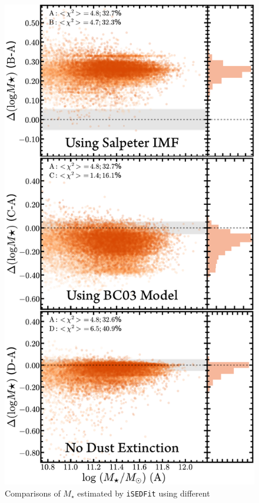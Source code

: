 \documentclass[a4paper,fleqn,usenatbib]{mnras}
\def\mstar{{$M_{\star}$}}
\begin{document}
    \begin{figure}
        \begin{center}
        \includegraphics[width=\columnwidth]{fig/redbcg_isedfit_3.pdf}
        \caption{
            Comparisons of \mstar{} estimated by \texttt{iSEDFit} using different
}
\end{center}
\end{figure}
\end{document}
